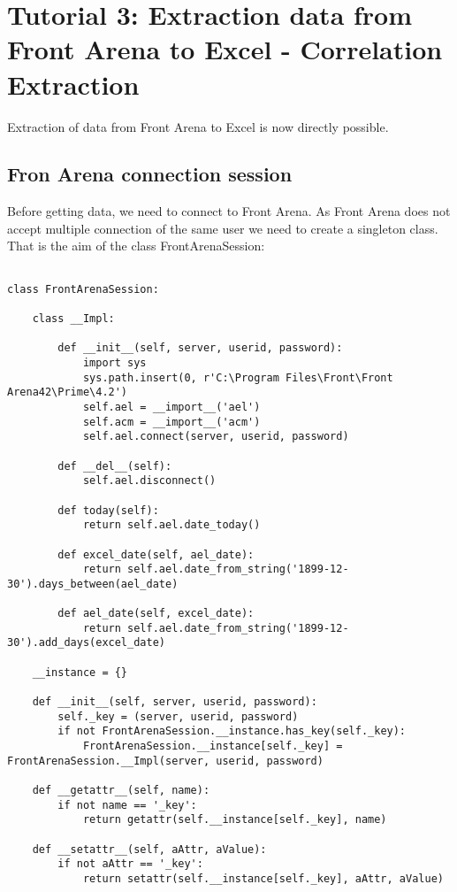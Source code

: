 \chapter{Tutorial 3: Extraction data from Front Arena to Excel - Correlation Extraction}

Extraction of data from Front Arena to Excel is now directly possible. 


\section{Fron Arena connection session}

Before getting data, we need to connect to Front Arena. As Front Arena does not accept multiple connection of the same user we need to create a singleton class. That is the aim of the class FrontArenaSession:

\begin{verbatim}

class FrontArenaSession:
    
    class __Impl:
        
        def __init__(self, server, userid, password):
            import sys
            sys.path.insert(0, r'C:\Program Files\Front\Front Arena42\Prime\4.2')
            self.ael = __import__('ael')
            self.acm = __import__('acm')
            self.ael.connect(server, userid, password)
 
        def __del__(self):
            self.ael.disconnect()
            
        def today(self):
            return self.ael.date_today()
        
        def excel_date(self, ael_date):
            return self.ael.date_from_string('1899-12-30').days_between(ael_date)
        
        def ael_date(self, excel_date):
            return self.ael.date_from_string('1899-12-30').add_days(excel_date)
                        
    __instance = {}
 
    def __init__(self, server, userid, password):
        self._key = (server, userid, password)
        if not FrontArenaSession.__instance.has_key(self._key):
            FrontArenaSession.__instance[self._key] = FrontArenaSession.__Impl(server, userid, password)
    
    def __getattr__(self, name):
        if not name == '_key':
            return getattr(self.__instance[self._key], name)
 
    def __setattr__(self, aAttr, aValue):
        if not aAttr == '_key':
            return setattr(self.__instance[self._key], aAttr, aValue)
            
\end{verbatim} 


